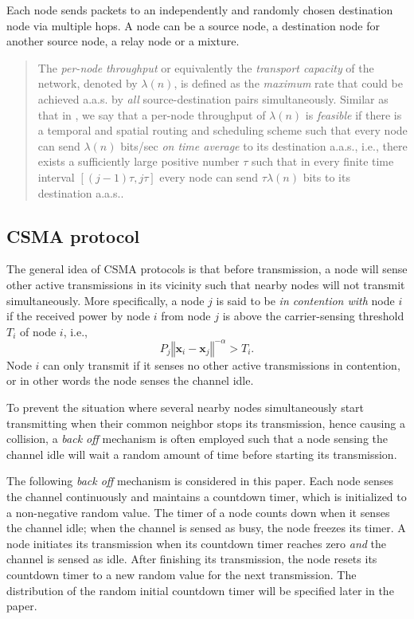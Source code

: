 \documentclass[english]{IEEEtran}
\theoremstyle{plain}
\theoremstyle{plain}
\theoremstyle{plain}
\theoremstyle{remark}
\begin{document}
Each node sends packets to an independently and randomly chosen destination
node via multiple hops. A node can be a source node, a destination
node for another source node, a relay node or a mixture. 
\begin{quotation}
The \emph{per-node} \emph{throughput} or equivalently the \emph{transport
capacity} of the network, denoted by $\lambda\left(n\right)$, is
defined as the \emph{maximum} rate that could be achieved a.a.s. by
\emph{all} source-destination pairs simultaneously. Similar as that
in \cite{Gupta00Capacity}, we say that a per-node throughput of $\lambda\left(n\right)$
is \emph{feasible} if there is a temporal and spatial routing and
scheduling scheme such that every node can send $\lambda\left(n\right)$
bits/sec \emph{on time average} to its destination a.a.s., i.e., there
exists a sufficiently large positive number $\tau$ such that in every
finite time interval $\left[\left(j-1\right)\tau,j\tau\right]$ every
node can send $\tau\lambda\left(n\right)$ bits to its destination
a.a.s.. 
\end{quotation}

\subsection{CSMA protocol}

The general idea of CSMA protocols is that before transmission, a
node will sense other active transmissions in its vicinity such that
nearby nodes will not transmit simultaneously. More specifically,
a node $j$ is said to be \emph{in contention with} node $i$ if the
received power by node $i$ from node $j$ is above the carrier-sensing
threshold $T_{i}$ of node $i$, i.e., 
\begin{equation}
P_{j}\left\Vert \boldsymbol{x}_{i}-\boldsymbol{x}_{j}\right\Vert ^{-\alpha}>T_{i}.\label{eq:carrier-sensing threshold}
\end{equation}
Node $i$ can only transmit if it senses no other active transmissions
in contention, or in other words the node senses the channel idle. 

To prevent the situation where several nearby nodes simultaneously
start transmitting when their common neighbor stops its transmission,
hence causing a collision, a \emph{back off} mechanism is often employed
such that a node sensing the channel idle will wait a random amount
of time before starting its transmission. 

The following \emph{back off} mechanism is considered in this paper.
Each node senses the channel continuously and maintains a countdown
timer, which is initialized to a non-negative random value. The timer
of a node counts down when it senses the channel idle; when the channel
is sensed as busy, the node freezes its timer. A node initiates its
transmission when its countdown timer reaches zero \emph{and} the
channel is sensed as idle. After finishing its transmission, the node
resets its countdown timer to a new random value for the next transmission.
The distribution of the random initial countdown timer will be specified
later in the paper.
\end{document}
